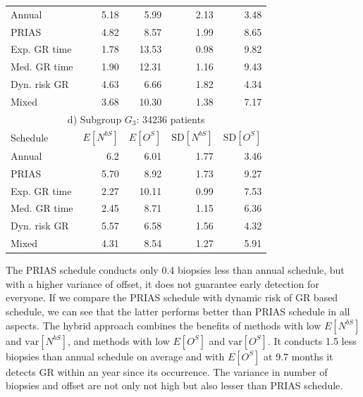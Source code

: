 \begin{table}
\begin{tabular}{lrrrr}
\hline
Annual         & 5.18            & 5.99                & 2.13          & 3.48              \\
PRIAS          & 4.82            & 8.57                & 1.99          & 8.65        \\
Exp. GR time & 1.78            & 13.53               & 0.98          & 9.82              \\
Med. GR time & 1.90             & 12.31               & 1.16          & 9.43              \\
Dyn. risk GR       & 4.63            & 6.66                & 1.82          & 4.34              \\
Mixed       & 3.68            & 10.30                & 1.38          & 7.17              \\
\hline      
\multicolumn{5}{c}{d) Subgroup $G_3$: 34236 patients}\\
\hline
Schedule        & $E[N^{bS}]$ & $E[O^{S}]$ & ${\mbox{SD}[N^{bS}]}$ & ${\mbox{SD}[O^S]}$ \\
\hline
Annual         & 6.2             & 6.01                & 1.77          & 3.46              \\
PRIAS          & 5.70             & 8.92                & 1.73          & 9.27        \\
Exp. GR time & 2.27            & 10.11               & 0.99          & 7.53              \\
Med. GR time & 2.45            & 8.71                & 1.15          & 6.36              \\
Dyn. risk GR       & 5.57            & 6.58                & 1.56          & 4.32              \\
Mixed       & 4.31            & 8.54                & 1.27          & 5.91              \\
\hline     
\end{tabular}
\end{table}

The PRIAS schedule conducts only 0.4 biopsies less than annual schedule, but with a higher variance of offset, it does not guarantee early detection for everyone. If we compare the PRIAS schedule with dynamic risk of GR based schedule, we can see that the latter performs better than PRIAS schedule in all aspects. The hybrid approach combines the benefits of methods with low $E[N^{bS}]$ and $\mbox{var}[N^{bS}]$, and methods with low $E[O^{S}]$ and $\mbox{var}[O^S]$. It conducts 1.5 less biopsies than annual schedule on average and with $E[O^{S}]$ at 9.7 months it detects GR within an year since its occurrence. The variance in number of biopsies and offset are not only not high but also lesser than PRIAS schedule.

